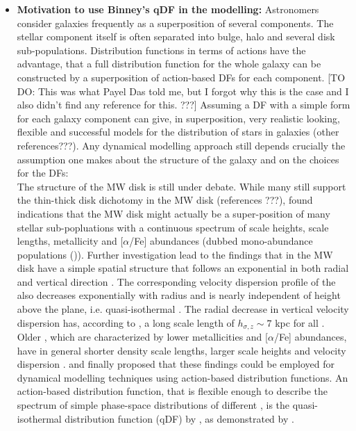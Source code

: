 \begin{itemize}
\item \textbf{Motivation to use Binney's qDF in the modelling:} Astronomers consider galaxies frequently as a superposition of several components. The stellar component itself is often separated into bulge, halo and several disk sub-populations. Distribution functions in terms of actions have the advantage, that a full distribution function for the whole galaxy can be constructed by a superposition of action-based DFs for each component. [TO DO: This was what Payel Das told me, but I forgot why this is the case and I also didn't find any reference for this. ???] Assuming a DF with a simple form for each galaxy component can give, in superposition, very realistic looking, flexible and successful models for the distribution of stars in galaxies \citep{bov13,san15,pif14} (other references???). Any dynamical modelling approach still depends crucially the assumption one makes about the structure of the galaxy and on the choices for the DFs:
\\The structure of the MW disk is still under debate. While many still support the thin-thick disk dichotomy in the MW disk (references ???), \citet{bov12b} found indications that the MW disk might actually be a super-position of many stellar sub-popluations with a continuous spectrum of scale heights, scale lengths, metallicity and [$\alpha$/Fe] abundances (dubbed mono-abundance populations (\MAPs)). Further investigation lead to the findings that \MAPs in the MW disk have a simple spatial structure that follows an exponential in both radial and vertical direction \citep{bov12d}. The corresponding velocity dispersion profile of the \MAPs also decreases exponentially with radius and is nearly independent of height above the plane, i.e. quasi-isothermal \citep{bov12c}. The radial decrease in vertical velocity dispersion has, according to \citet{bov12c}, a long scale length of $h_{\sigma,z} \sim 7$ kpc for all \MAPs. Older \MAPs, which are characterized by lower metallicities and [$\alpha$/Fe] abundances, have in general shorter density scale lengths, larger scale heights and velocity dispersion \citep{bov12d}. \citet{tin13} and \citet{bov13} finally proposed that these findings could be employed for dynamical modelling techniques using action-based distribution functions. An action-based distribution function, that is flexible enough to describe the spectrum of simple phase-space distributions of different \MAPs, is the quasi-isothermal distribution function (qDF) by \citet{bin11}, as demonstrated by \citet{tin13}.


\end{itemize}
